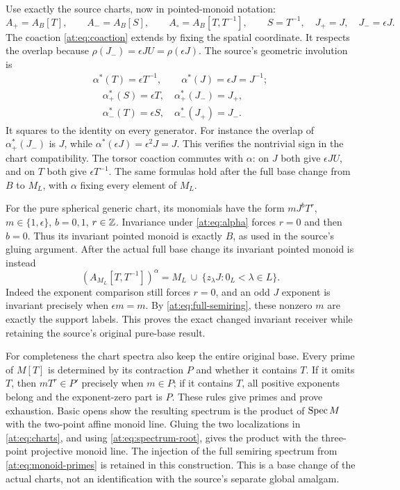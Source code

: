 Use exactly the source charts, now in pointed-monoid notation:
\[
 A_+=A_B[T],\qquad A_-=A_B[S],\qquad
 A_\circ=A_B[T,T^{-1}],\qquad
 S=T^{-1},\quad J_+=J,\quad J_-=\epsilon J.
 \tag{AT15}\label{at:eq:charts}
\]
The coaction \eqref{at:eq:coaction} extends by fixing the spatial
coordinate. It respects the overlap because
$\rho(J_-)=\epsilon JU=\rho(\epsilon J)$.
The source's geometric involution is
\[
 \begin{gathered}\alpha^*(T)=\epsilon T^{-1},\qquad
 \alpha^*(J)=\epsilon J=J^{-1};\\
 \quad
 \alpha_+^*(S)=\epsilon T,\quad\alpha_+^*(J_-)=J_+,\\
 \quad
 \alpha_-^*(T)=\epsilon S,\quad\alpha_-^*(J_+)=J_-.
 \end{gathered}\tag{AT16}\label{at:eq:alpha}
\]
It squares to the identity on every generator. For instance the
overlap of $\alpha_+^*(J_-)$ is $J$, while
$\alpha^*(\epsilon J)=\epsilon^2J=J$. This verifies the
nontrivial sign in the chart compatibility. The torsor coaction
commutes with $\alpha$: on $J$ both give $\epsilon JU$, and
on $T$ both give $\epsilon T^{-1}$. The same formulas hold
after the full base change from $B$ to $M_L$, with $\alpha$
fixing every element of $M_L$.

For the pure spherical generic chart, its monomials have the
form $mJ^bT^r$, $m\in\{1,\epsilon\}$, $b=0,1$, $r\in\mathbb Z$.
Invariance under \eqref{at:eq:alpha} forces $r=0$ and then $b=0$.
Thus its invariant pointed monoid is exactly $B$, as used in
the source's gluing argument. After the actual full base change
its invariant pointed monoid is instead
\[
 (A_{M_L}[T,T^{-1}])^\alpha
    =M_L\ \cup\ \{z_\lambda J:0_L<\lambda\in L\}.
 \tag{AT17}\label{at:eq:full-invariants}
\]
Indeed the exponent comparison still forces $r=0$, and an odd
$J$ exponent is invariant precisely when $\epsilon m=m$.
By \eqref{at:eq:full-semiring}, these nonzero $m$ are exactly
the support labels. This proves the exact changed invariant
receiver while retaining the source's original pure-base result.

For completeness the chart spectra also keep the entire original
base. Every prime of $M[T]$ is determined by its contraction $P$
and whether it contains $T$. If it omits $T$, then
$mT^r\in P'$ precisely when $m\in P$; if it contains $T$,
all positive exponents belong and the exponent-zero part is $P$.
These rules give primes and prove exhaustion. Basic opens show
the resulting spectrum is the product of $\operatorname{Spec} M$ with the
two-point affine monoid line. Gluing the two localizations in
\eqref{at:eq:charts}, and using \eqref{at:eq:spectrum-root}, gives
the product with the three-point projective monoid line.
The injection of the full semiring spectrum from
\eqref{at:eq:monoid-primes} is retained in this construction.
This is a base change of the actual charts, not an identification
with the source's separate global amalgam.

